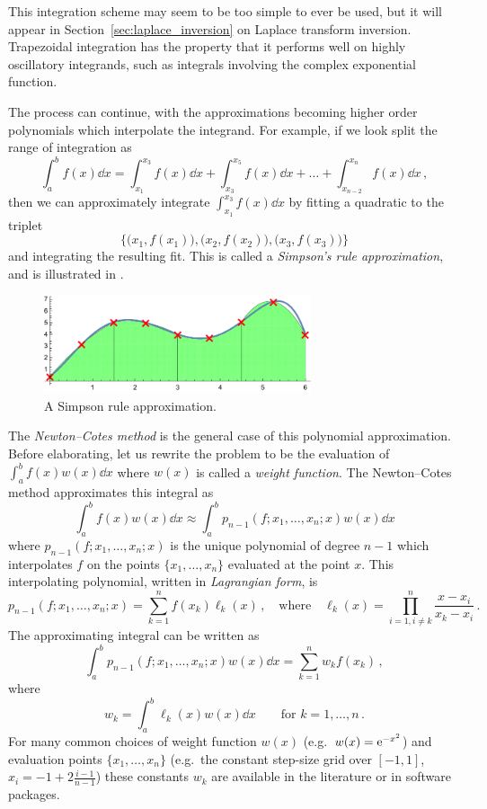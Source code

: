 This integration scheme may seem to be too simple to ever be used, but it will appear in Section~\ref{sec:laplace_inversion} on Laplace transform inversion. Trapezoidal integration has the property that it performs well on highly oscillatory integrands, such as integrals involving the complex exponential function.

The process can continue, with the approximations becoming higher order polynomials which interpolate the integrand. For example, if we look split the range of integration as
\[ \int_a^b f(x) \dd x = \int_{x_1}^{x_3} f(x) \dd x + \int_{x_3}^{x_5} f(x) \dd x + \dots + \int_{x_{n-2}}^{x_n} f(x) \dd x \,, \]
then we can approximately integrate $\int_{x_1}^{x_3} f(x) \dd x$ by fitting a quadratic to the triplet \[ \bigl\{ \bigl( x_1, f(x_1) \bigr), \bigl(x_2, f(x_2)\bigr), \bigl(x_3, f(x_3)\bigr) \bigr\} \]
and integrating the resulting fit. This is called a \emph{Simpson's rule approximation}, and is illustrated in .

\begin{figure}[H]
\centering
\includegraphics[width=0.7\textwidth]{images/simpson.pdf}
\caption{A Simpson rule approximation.}
\label{fig:simpson}
\end{figure}

The \emph{Newton--Cotes method} is the general case of this polynomial approximation.
Before elaborating, let us rewrite the problem to be the evaluation of $\int_a^b f(x) w(x) \dd x$ where $w(x)$ is called a \emph{weight function}.
The Newton--Cotes method approximates this integral as
\begin{equation} \label{NewtonCotesApprox}
\int_a^b f(x) w(x) \dd x \approx \int_a^b p_{n-1}(f; x_1, \dots, x_n; x) w(x) \dd x
\end{equation}
where $p_{n-1}(f; x_1, \dots, x_n; x)$ is the unique polynomial of degree $n-1$ which interpolates $f$ on the points $\{ x_1, \dots, x_n\}$ evaluated at the point $x$.
This interpolating polynomial, written in \emph{Lagrangian form}, is
\[ p_{n-1}(f; x_1, \dots, x_n; x) = \sum_{k=1}^{n} f(x_k) \ell_k(x) \,, \quad \text{where} \quad \ell_k(x) = \prod_{i=1, i\not=k}^n \frac{x - x_i}{x_k - x_i}  \,. \]
The approximating integral can be written as
\[ \int_a^b p_{n-1}(f; x_1, \dots, x_n; x) w(x) \dd x = \sum_{k=1}^n w_k f(x_k) \,, \]
where
\begin{equation} \label{NewtonCotesWeights}
	w_k = \int_a^b \ell_k(x) w(x) \dd x \qquad \text{for } k=1,\dots,n \,.
\end{equation}
For many common choices of weight function $w(x)$ (e.g.\ $w(x) = \mathrm{e}^{-x^2}$) and evaluation points $\{x_1,\dots,x_n\}$ (e.g.\ the constant step-size grid over $[-1,1]$, $x_i = -1 + 2 \frac{i-1}{n-1}$) these constants $w_k$ are available in the literature or in software packages.

